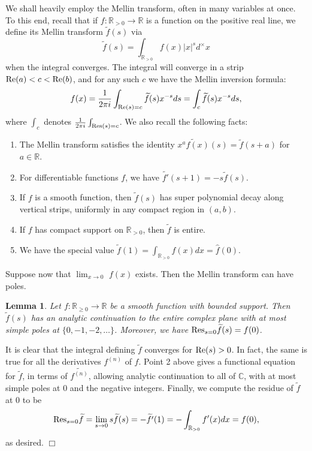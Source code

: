 \documentclass{article}
\def\Res{{\rm Res}}
\def\Re{{\rm Re}}
\def\R{{\mathbb R}}
\def\C{{\mathbb C}}
\def\wt{\widetilde}
\newtheorem{lemma}[theorem]{Lemma}
\newenvironment{proof}{\noindent {\bf Proof:}}{$\Box$ \vspace{2 ex}}
\begin{document}
We shall heavily employ the Mellin transform, often in many variables at once. To this end, recall that if $f:\R_{> 0}\to\R$ is a function on the positive real line, we define its Mellin transform $\wt{f}(s)$ via $$\wt{f}(s) = \int_{\R_{> 0}}f(x)|x|^{s}d^{\times}x$$ when the integral converges. The integral will converge in a strip $\Re(a)<c<\Re(b)$, and for any such $c$ we have the Mellin inversion formula:
\begin{equation*}
f(x) = \frac{1}{2\pi i}\int_{\Re(s)=c} \wt{f}(s) x^{-s}ds=\int_c \wt{f}(s) x^{-s}ds,
\end{equation*}
where $\int_c$ denotes $\frac{1}{2\pi i}\int_{\Res(s)=c}$.
We also recall the following facts: 
\begin{enumerate}
\item The Mellin transform satisfies the identity $\wt{x^af(x)}(s)=\wt{f}(s+a)$ for $a\in\R$.
\item For differentiable functions $f$, we have $\wt{f'}(s+1)=-s\wt{f}(s)$.
\item If $f$ is a smooth function, then $\wt{f}(s)$ has super polynomial decay along vertical strips, uniformly in any compact region in $(a,b)$. 
\item If $f$ has compact support on $\R_{>0}$, then $\wt{f}$ is entire. 

\item We have the special value $\tilde{f}(1) = \int_{\R_{>0}}f(x)dx= \hat{f}(0)$.
\end{enumerate}
Suppose now that $\lim_{x\to 0}$ $f(x)$ exists. Then the Mellin transform can have poles.
\begin{lemma}
Let $f:\R_{\geq 0}\to\R$ be a smooth function with bounded support. Then $\wt{f}(s)$ has an analytic continuation to the entire complex plane with at most simple poles at $\{0,-1,-2,\ldots\}$. Moreover, we have $\Res_{s=0}\wt{f}(s)=f(0)$.
\end{lemma}
\begin{proof}
It is clear that the integral defining $\wt{f}$ converges for $\Re(s)>0$. In fact, the same is true for all the derivatives $f^{(n)}$ of $f$. Point 2 above gives a functional equation for $\wt{f}$, in terms of $\wt{f^{(n)}}$, allowing analytic continuation to all of $\C$, with at most simple poles at $0$ and the negative integers. Finally, we compute the residue of $\wt{f}$ at $0$ to be
\begin{equation*}
\Res_{s=0}\wt{f}=\lim_{s\to 0}s\wt{f}(s)=-\wt{f'}(1)=-\int_{\R_{>0}}f'(x)dx=f(0),
\end{equation*}
as desired.
\end{proof}
\end{document}
